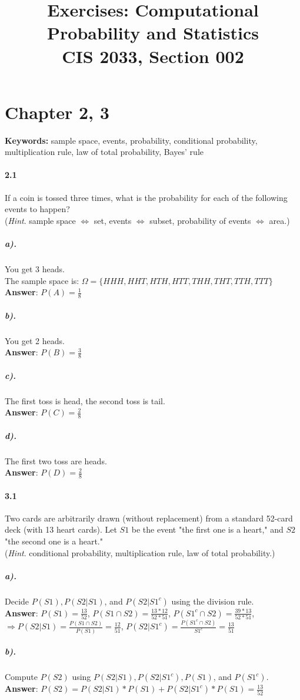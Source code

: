 \documentclass[11pt]{article} %
\title{Exercises: Computational Probability and Statistics \\
CIS 2033, Section 002}
\begin{document}
\maketitle
\section{Chapter 2, 3}
\textbf{Keywords:} sample space, events, probability, conditional probability, multiplication rule, law of total probability, Bayes' rule
\paragraph*{2.1} If a coin is tossed three times, what is the probability for each of the following events to happen?\\
(\textit{Hint}. sample space $\Leftrightarrow$ set, events $\Leftrightarrow$ subset, probability of events $\Leftrightarrow$ area.)
\subparagraph*{a).} You get 3 heads.\\
The sample space is: $\Omega	=\{HHH, HHT, HTH, HTT, THH, THT, TTH, TTT\}$ \\
\textbf{Answer}: $P(A) = \frac{1}{8}$
\subparagraph*{b).} You get 2 heads. \\
\textbf{Answer}: $P(B) = \frac{3}{8}$
\subparagraph*{c).} The first toss is head, the second toss is tail.\\
\textbf{Answer}: $P(C) = \frac{2}{8}$
\subparagraph*{d).} The first two toss are heads.\\
\textbf{Answer}: $P(D) = \frac{2}{8}$

\paragraph*{3.1} Two cards are arbitrarily drawn (without replacement) from a standard 52-card deck (with 13 heart cards). Let $S1$ be the event "the first one is a heart," and $S2$ "the second one is a heart."\\
(\textit{Hint}. conditional probability, multiplication rule, law of total probability.)
\subparagraph*{a).} Decide $P(S1), P(S2 | S1)$, and $P(S2 | S1^c)$ using the division rule.\\
\textbf{Answer}: $P(S1) = \frac{13}{52}$, $P(S1 \cap S2) = \frac{13 * 12}{52*51}$, $P(S1^c \cap S2) = \frac{39*13}{52 * 51}$, \\
$ \Rightarrow P(S2 | S1)=\frac{P(S1 \cap S2)}{P(S1)} = \frac{12}{51}$, $P(S2 | S1^c) = \frac{P(S1^c \cap S2)}{S1^c} = \frac{13}{51}$
\subparagraph*{b).} Compute $P(S2)$ using $P(S2 | S1),  P(S2 | S1^c), P(S1)$, and $P(S1^c)$.\\
\textbf{Answer}: $P(S2) = P(S2 | S1)* P(S1) + P(S2 | S1^c) *P(S1) = \frac{13}{52}$
\end{document}
